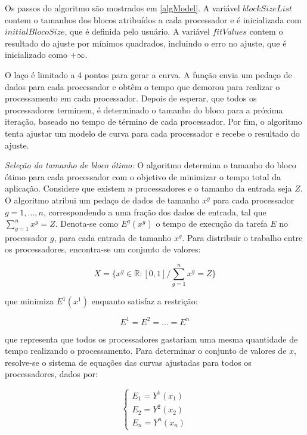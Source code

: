 Os passos do algoritmo são mostrados em \ref{algModel}. A variável $blockSizeList$ contem o tamanhos dos blocos atribuídos a cada processador e é inicializada com $initialBlocoSize$, que é definida  pelo usuário. A variável $fitValues$ contem o resultado do ajuste por mínimos quadrados, incluindo o erro no ajuste, que é inicializado como $+\infty$. 

O laço é limitado a 4 pontos para gerar a curva. A função envia um pedaço de dados para cada processador e obtêm o tempo que demorou para realizar o processamento em cada processador. Depois de esperar, que todos os processadores terminem, é determinado o tamanho do bloco para a próxima iteração, baseado no tempo de término de cada processador. Por fim, o algoritmo tenta ajustar um modelo de curva para cada processador e recebe o resultado do ajuste.

\textit{Seleção do tamanho de bloco ótimo:} O algoritmo determina o tamanho do bloco ótimo para cada processador com o objetivo de minimizar o  tempo total da aplicação. Considere que existem $n$ processadores e o tamanho da entrada seja $Z$. O algoritmo atribui um pedaço de dados de tamanho $x^g$ para cada processador $g= 1,..., n$, correspondendo a uma fração dos dados de entrada, tal que $\sum_{g=1}^n x^g = Z$. Denota-se como $E^g(x^g)$ o tempo de execução da tarefa $E$ no processador $g$, para cada entrada de tamanho $x^g$. Para distribuir o trabalho entre os processadores, encontra-se um conjunto de valores:

\begin{equation}
	X = \{ x^g \in \mathbb{R}:[0,1] / \sum_{g=1}^n x^g = Z \}
	\label{eq: totalResultado}
\end{equation}

que minimiza $E^1(x^1)$ enquanto satisfaz a restrição:

\begin{equation}
	E^{1} = E^{2} = ...= E^{n}
	\label{eq: Restricao}
\end{equation}
 
que representa que todos os processadores gastariam uma mesma quantidade de tempo realizando o processamento. Para determinar o conjunto de valores de $x$, resolve-se o sistema de equações das curvas ajustadas para todos os processadores, dados por:

\begin{equation}
	\left\lbrace
	\begin{array}{ll}
		\displaystyle E_{1} = Y^1(x_{1})  \\
		\displaystyle E_{2} = Y^2(x_{2})   \\
		\displaystyle E_{n} = Y^n(x_{n}) 
		\label{eq: system}
	\end{array}
	\right.
\end{equation}

